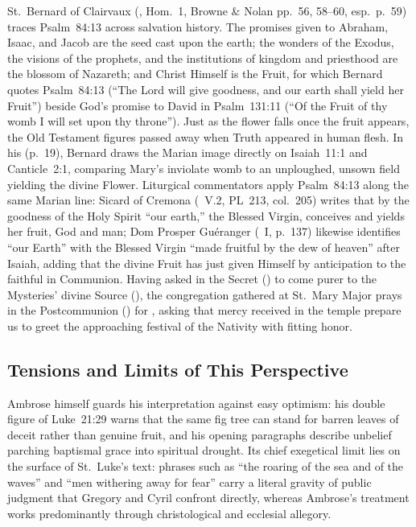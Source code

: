 St.~Bernard of Clairvaux (, Hom.~1, Browne \& Nolan pp.~56, 58--60, esp.~p.~59) traces Psalm~84:13 across salvation history. The promises given to Abraham, Isaac, and Jacob are the seed cast upon the earth; the wonders of the Exodus, the visions of the prophets, and the institutions of kingdom and priesthood are the blossom of Nazareth; and Christ Himself is the Fruit, for which Bernard quotes Psalm~84:13 (``The Lord will give goodness, and our earth shall yield her Fruit'') beside God's promise to David in Psalm~131:11 (``Of the Fruit of thy womb I will set upon thy throne''). Just as the flower falls once the fruit appears, the Old Testament figures passed away when Truth appeared in human flesh. In his  (p.~19), Bernard draws the Marian image directly on Isaiah~11:1 and Canticle~2:1, comparing Mary's inviolate womb to an unploughed, unsown field yielding the divine Flower. Liturgical commentators apply Psalm~84:13 along the same Marian line: Sicard of Cremona (~V.2, PL~213, col.~205) writes that by the goodness of the Holy Spirit ``our earth,'' the Blessed Virgin, conceives and yields her fruit, God and man; Dom Prosper Gu\'eranger (~I, p.~137) likewise identifies ``our Earth'' with the Blessed Virgin ``made fruitful by the dew of heaven'' after Isaiah, adding that the divine Fruit has just given Himself by anticipation to the faithful in Communion. Having asked in the Secret () to come purer to the Mysteries' divine Source (), the congregation gathered at St.~Mary Major prays in the Postcommunion () for , asking that mercy received in the temple prepare us to greet the approaching festival of the Nativity with fitting honor.

\subsection{Tensions and Limits of This Perspective}

Ambrose himself guards his interpretation against easy optimism: his double figure of Luke~21:29 warns that the same fig tree can stand for barren leaves of deceit rather than genuine fruit, and his opening paragraphs describe unbelief parching baptismal grace into spiritual drought. Its chief exegetical limit lies on the surface of St.~Luke's text: phrases such as ``the roaring of the sea and of the waves'' and ``men withering away for fear'' carry a literal gravity of public judgment that Gregory and Cyril confront directly, whereas Ambrose's treatment works predominantly through christological and ecclesial allegory.

